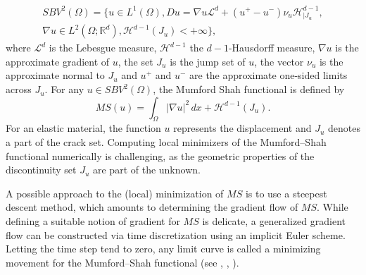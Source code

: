 \documentclass[reqno,12pt,twoside]{amsart}
\numberwithin{equation}{section} \numberwithin{theorem}{section}
\numberwithin{proposition}{section} \numberwithin{lemma}{section}
\numberwithin{corollary}{section}
\numberwithin{definition}{section} \numberwithin{remark}{section}
\begin{document}
\begin{multline*}
SBV^2(\Omega) = \{u \in L^1(\Omega), Du = \nabla u \mathcal{L}^d + (u^+ -u^-)\nu_u \mathcal{H}^{d-1}_{\rvert J_u},\\
\nabla u \in L^2(\Omega; \mathbb{R}^d), \mathcal{H}^{d-1} (J_u) < +\infty \},
\end{multline*}
where $\mathcal{L}^d$ is the Lebesgue measure, $\mathcal{H}^{d-1}$ the $d-1$-Hausdorff measure, $\nabla u$ is the approximate gradient of $u$, the set $J_u$ is the jump set of $u$, the vector $\nu_u$ is the approximate normal to $J_u$ and $u^+$ and $u^-$ are the approximate one-sided limits across $J_u$. For any $u \in SBV^2(\Omega)$, the Mumford Shah functional is defined by 
\[
MS(u) = \int_\Omega |\nabla u|^2 \, dx +  \mathcal{H}^{d-1}(J_u).
\]
For an elastic material, the function $u$ represents the displacement and $J_u$ denotes a part of the crack set.
Computing local minimizers of the Mumford--Shah functional numerically is challenging, as the geometric properties of the discontinuity set $J_u$ are part of the unknown.

A possible approach to the (local) minimization of $MS$ is to use a steepest descent method, which amounts to determining the gradient flow of $MS$. While defining a suitable notion of gradient for $MS$ is delicate, a generalized gradient flow can be constructed via time discretization using an implicit Euler scheme. Letting the time step tend to zero, any limit curve is called a minimizing movement for the Mumford--Shah functional (see \cite{DG93}, \cite{A95}, \cite{CD97}). 

\smallskip
\end{document}
